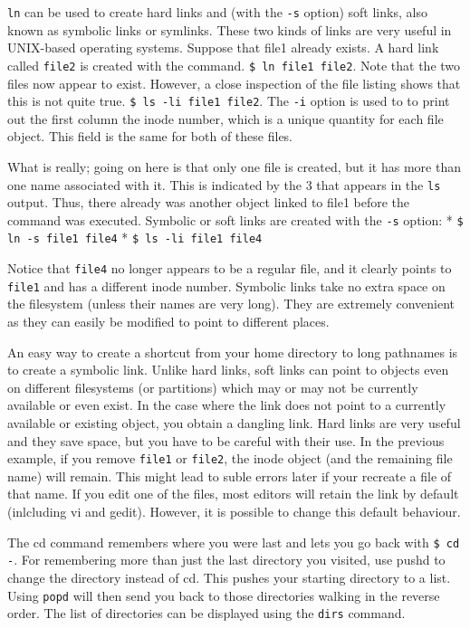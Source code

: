 \texttt{ln} can be used to create hard links and (with the \texttt{-s}
option) soft links, also known as symbolic links or symlinks. These two
kinds of links are very useful in UNIX-based operating systems. Suppose
that file1 already exists. A hard link called \texttt{file2} is created
with the command. \texttt{\$ ln file1 file2}. Note that the two files
now appear to exist. However, a close inspection of the file listing
shows that this is not quite true. \texttt{\$ ls -li file1 file2}. The
\texttt{-i} option is used to to print out the first column the inode
number, which is a unique quantity for each file object. This field is
the same for both of these files.

What is really; going on here is that only one file is created, but it
has more than one name associated with it. This is indicated by the 3
that appears in the \texttt{ls} output. Thus, there already was another
object linked to file1 before the command was executed. Symbolic or soft
links are created with the \texttt{-s} option: *
\texttt{\$ ln -s file1 file4} * \texttt{\$ ls -li file1 file4}

Notice that \texttt{file4} no longer appears to be a regular file, and
it clearly points to \texttt{file1} and has a different inode number.
Symbolic links take no extra space on the filesystem (unless their names
are very long). They are extremely convenient as they can easily be
modified to point to different places.

An easy way to create a shortcut from your home directory to long
pathnames is to create a symbolic link. Unlike hard links, soft links
can point to objects even on different filesystems (or partitions) which
may or may not be currently available or even exist. In the case where
the link does not point to a currently available or existing object, you
obtain a dangling link. Hard links are very useful and they save space,
but you have to be careful with their use. In the previous example, if
you remove \texttt{file1} or \texttt{file2}, the inode object (and the
remaining file name) will remain. This might lead to suble errors later
if your recreate a file of that name. If you edit one of the files, most
editors will retain the link by default (inlcluding vi and gedit).
However, it is possible to change this default behaviour.

The cd command remembers where you were last and lets you go back with
\texttt{\$ cd -}. For remembering more than just the last directory you
visited, use pushd to change the directory instead of cd. This pushes
your starting directory to a list. Using \texttt{popd} will then send
you back to those directories walking in the reverse order. The list of
directories can be displayed using the \texttt{dirs} command.

